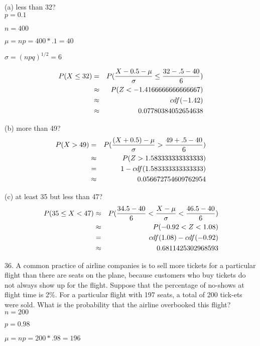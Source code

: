 (a) less than 32? \\

$p = 0.1$

$n = 400$

$\mu = np = 400 * .1 = 40$

$\sigma = (npq)^{1/2} = 6$

\begin{eqnarray*}
P(X \leq 32) & = & P(\frac{X - 0.5 - \mu}{\sigma} \leq \frac{32 - .5 -40 }{6}) \\
& \approx & P(Z < -1.4166666666666667) \\
& \approx & cdf(-1.42) \\
& \approx & 0.07780384052654638
\end{eqnarray*}

(b) more than 49? \\

\begin{eqnarray*}
P(X > 49) & = & P(\frac{(X + 0.5)-\mu}{\sigma} > \frac{49+.5-40}{6}) \\
  & \approx & P(Z > 1.583333333333333) \\
  & = & 1 - cdf(1.583333333333333) \\
& \approx & 0.056672754609762954 \\
\end{eqnarray*}

(c) at least 35 but less than 47? \\

\begin{eqnarray*}
P(35 \leq X < 47) & \approx & P(\frac{34.5 - 40}{6} < \frac{X - \mu}{\sigma} < \frac{46.5 - 40}{6}) \\
& \approx & P(-0.92 < Z < 1.08) \\
& = & cdf(1.08) - cdf(-0.92) \\
& \approx & 0.6811425302968593
\end{eqnarray*}

36. A common practice of airline companies is to sell more tickets for a particular flight than there are seats on the plane, because customers who buy tickets do not always show up for the flight. Suppose that the percentage of no-shows at flight time is 2\%. For a particular flight with 197 seats, a total of 200 tick-ets were sold. What is the probability that the airline
overbooked this flight? \\

$n = 200$

$p = 0.98$

$\mu = np = 200 * .98 = 196$

